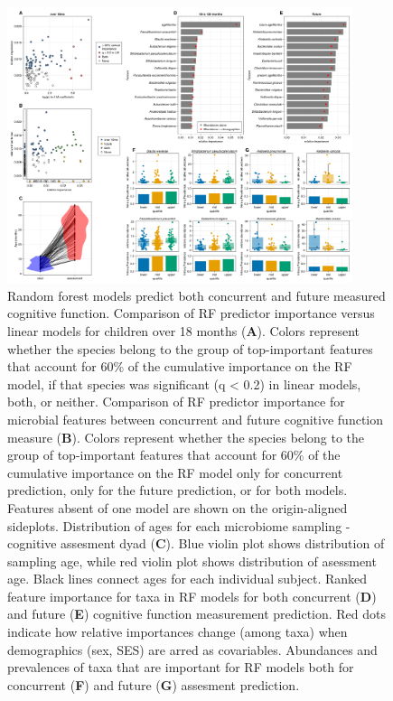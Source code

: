 \documentclass{article}
\begin{document}
\begin{figure}
    \centering
    \small
    \includegraphics[width=0.9\textwidth]{assets/Figure3.png}
    \caption{
        Random forest models predict both concurrent and future measured cognitive function.
        Comparison of RF predictor importance versus linear models for children
        over 18 months (\textbf{A}).
        Colors represent whether the species belong to the group of
        top-important features that account for 60\% of the cumulative
        importance on the RF model, if that species was significant (q
        \textless{} 0.2) in linear models, both, or neither.
        Comparison of RF predictor importance for microbial features
        between concurrent and future cognitive function measure
        (\textbf{B}).
        Colors represent whether the species belong to the group of
        top-important features that account for 60\% of the cumulative
        importance on the RF model only for concurrent prediction,
        only for the future prediction, or for both models.
        Features absent of one model are shown on the origin-aligned sideplots.
        Distribution of ages for each microbiome sampling - cognitive assesment dyad (\textbf{C}).
        Blue violin plot shows distribution of sampling age,
        while red violin plot shows distribution of asessment age.
        Black lines connect ages for each individual subject.      
        Ranked feature importance for taxa in RF models for
        both concurrent (\textbf{D}) and future (\textbf{E})
        cognitive function measurement prediction.
        Red dots indicate how relative importances change (among taxa)
        when demographics (sex, SES) are arred as covariables.
        Abundances and prevalences of taxa that are important
        for RF models both for concurrent (\textbf{F}) and future (\textbf{G}) assesment prediction.
        }
    \label{fig:3}
\end{figure}
\end{document}
